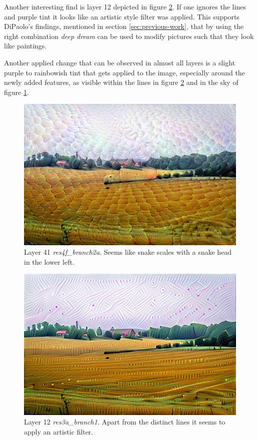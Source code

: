 Another interesting find is layer 12 depicted in figure \ref{fig:layer-artistic}.
If one ignores the lines and purple tint it looks like an artistic style filter was applied.
This supports DiPaolo's findings, mentioned in section \ref{sec:previous-work}, that by using the right combination \textit{deep dream} can be used to modify pictures such that they look like paintings.

Another applied change that can be observed in almost all layers is a slight purple to rainbowish tint that gets applied to the image, especially around the newly added features, as visible within the lines in figure \ref{fig:layer-artistic} and in the sky of figure \ref{fig:layer-snake}.

\begin{figure}[H]
	\centering
	\includegraphics[width=0.7\linewidth]{img/alpsted-landscape_res4f_branch2a.jpg}
	\caption{Layer 41 \emph{res4f\_branch2a}. Seems like snake scales with a snake head in the lower left.}
	\label{fig:layer-snake}
\end{figure}
\begin{figure}[H]
\centering
\includegraphics[width=0.7\linewidth]{img/alpsted-landscape_res3a_branch1.jpg}
\caption{Layer 12 \emph{res3a\_branch1}. Apart from the distinct lines it seems to apply an artistic filter.}
\label{fig:layer-artistic}
\end{figure}


